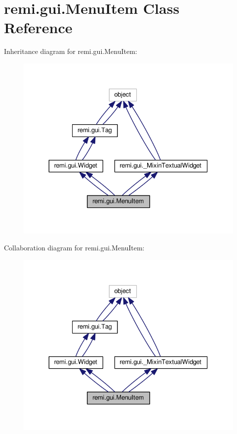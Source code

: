 \hypertarget{classremi_1_1gui_1_1MenuItem}{}\section{remi.\+gui.\+Menu\+Item Class Reference}
\label{classremi_1_1gui_1_1MenuItem}


Inheritance diagram for remi.\+gui.\+Menu\+Item\+:
\nopagebreak
\begin{figure}[H]
\begin{center}
\leavevmode
\includegraphics[width=330pt]{d8/d84/classremi_1_1gui_1_1MenuItem__inherit__graph}
\end{center}
\end{figure}


Collaboration diagram for remi.\+gui.\+Menu\+Item\+:
\nopagebreak
\begin{figure}[H]
\begin{center}
\leavevmode
\includegraphics[width=330pt]{d3/dec/classremi_1_1gui_1_1MenuItem__coll__graph}
\end{center}
\end{figure}
